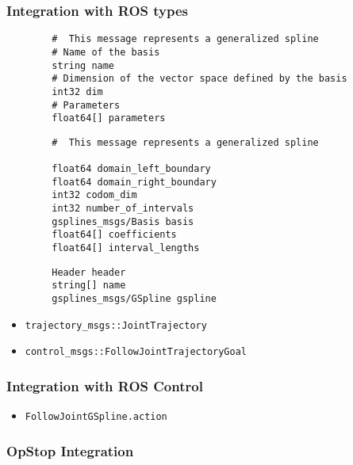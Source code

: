 \begin{frame}[fragile]
	\frametitle{Integration with ROS types}
	\begin{lstlisting}
        #  This message represents a generalized spline
        # Name of the basis
        string name
        # Dimension of the vector space defined by the basis
        int32 dim
        # Parameters
        float64[] parameters
	\end{lstlisting}
	\begin{lstlisting}
        #  This message represents a generalized spline

        float64 domain_left_boundary
        float64 domain_right_boundary
        int32 codom_dim
        int32 number_of_intervals
        gsplines_msgs/Basis basis
        float64[] coefficients
        float64[] interval_lengths
	\end{lstlisting}
	\begin{lstlisting}
        Header header
        string[] name
        gsplines_msgs/GSpline gspline
	\end{lstlisting}
	\begin{itemize}
		\item \Verb|trajectory_msgs::JointTrajectory|
		\item \Verb|control_msgs::FollowJointTrajectoryGoal|

	\end{itemize}
\end{frame}

\begin{frame}[fragile]
	\frametitle{Integration with ROS Control}
	\begin{itemize}
		\item \Verb|FollowJointGSpline.action|
	\end{itemize}


\end{frame}

\begin{frame}[t]
	\frametitle{OpStop Integration}

\end{frame}

